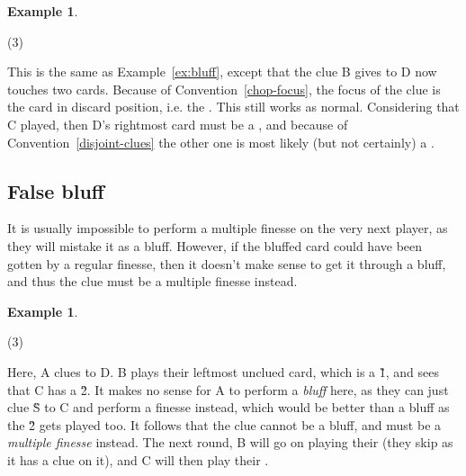 \documentclass[a4paper]{article}
\theoremstyle{plain}
\theoremstyle{definition}
\newtheorem{example}[theorem]{Example}
\begin{document}
\begin{example}
	\hfill
	\begin{tasks}(3)
		\task[+]      
		\task[A]    
		\task[B]    
		\task[C]    
		\task[D]    
		\task[E]    
	\end{tasks}
	
	This is the same as Example~\ref{ex:bluff}, except that the  clue B gives to D now touches two cards. Because of Convention~\ref{chop-focus}, the focus of the clue is the card in discard position, i.e. the . This still works as normal. Considering that C played, then D's rightmost card must be a , and because of Convention~\ref{disjoint-clues} the other one is most likely (but not certainly) a .
\end{example}

\subsection{False bluff}

It is usually impossible to perform a multiple finesse on the very next player, as they will mistake it as a bluff. However, if the bluffed card could have been gotten by a regular finesse, then it doesn't make sense to get it through a bluff, and thus the clue must be a multiple finesse instead.

\begin{example}
	\hfill	
	\begin{tasks}(3)
		\task[+]      
		\task[A]    
		\task[B]    
		\task[C]    
		\task[D]    
		\task[E]    
	\end{tasks}
	
	Here, A clues  to D. B plays their leftmost unclued card, which is a \G{1}, and sees that C has a \G{2}. It makes no sense for A to perform a \textit{bluff} here, as they can just clue \G{S} to C and perform a finesse instead, which would be better than a bluff as the \G{2} gets played too. It follows that the  clue cannot be a bluff, and must be a \textit{multiple finesse} instead. The next round, B will go on playing their  (they skip  as it has a  clue on it), and C will then play their .
\end{example}
\end{document}

